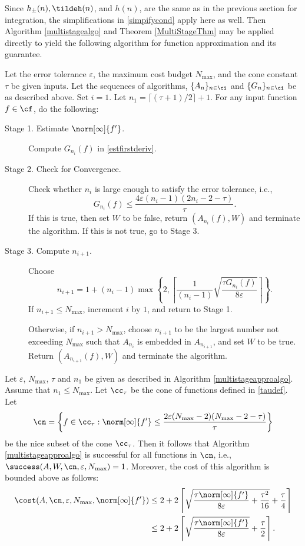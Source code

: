 Since $h_{\pm}(n), \tildeh(n)$, and $h(n)$, are the same as in the previous section for integration, the simplifications in \ref{simpifycond} apply here as well.  Then Algorithm \ref{multistagealgo} and Theorem \ref{MultiStageThm} may be applied directly to  yield the following algorithm for function approximation and its guarantee.

\begin{algo} \label{multistageapproalgo}
Let the error tolerance $\varepsilon$, the maximum cost budget $N_{\max}$, and the cone constant $\tau$ be given inputs. Let the sequences of algorithms, $\{A_n\}_{n \in \ci}$ and  $\{G_n\}_{n \in \ci}$ be as described above.  Set $i=1$.  Let $n_1=\lceil (\tau+1)/2\rceil + 1$. For any input function $f \in \cf$, do the following:
\begin{description}

\item [Stage 1. Estimate {$\norm[\infty]{f'} $}.]
Compute $G_{n_i}(f)$ in \eqref{estfirstderiv}.

\item [Stage 2. Check for Convergence.]
Check whether $n_i$ is large enough to satisfy the error tolerance, i.e.,
$$
G_{n_i}(f) \le \frac{4\varepsilon (n_i-1)(2n_i-2 -\tau)}{\tau} .
$$
If this is true, then set $W$ to be false, return $(A_{n_i}(f),W)$ and terminate the algorithm.   If this is not true, go to Stage 3.

\item[Stage 3. Compute $n_{i+1}$.]  Choose
$$
n_{i+1}=1+ (n_i-1)\max\left\{2,\left\lceil\frac{1}{(n_i-1)}\sqrt{\frac{\tau G_{n_i}(f)}{8\varepsilon}}\right\rceil\right\}.
$$
If $n_{i+1} \le N_{\max}$, increment $i$ by $1$, and return to Stage 1.

Otherwise, if $n_{i+1} > N_{\max}$, choose $n_{i+1}$ to be the largest number not exceeding $N_{\max}$ such that $A_{n_{i}}$ is embedded in $A_{n_{i+1}}$, and set $W$ to be true. Return $(A_{n_{i+1}}(f),W)$ and terminate the algorithm.
\end{description}
\end{algo}

\begin{theorem} \label{multistageappxthm} Let  $\varepsilon$, $N_{\max}$, $\tau$ and $n_1$ be given as described in Algorithm \ref{multistageapproalgo}.  Assume that $n_1 \le N_{\max}$.  Let $\cc_\tau$ be the cone of functions defined in \eqref{taudef}.  Let
$$
\cn
= \left \{ f \in \cc_\tau : \norm[\infty]{f'} \le \frac{2\varepsilon (N_{\max}-2)(N_{\max}-2 -\tau)}{\tau} \right\}
$$
be the nice subset of the cone $\cc_\tau$.  Then it follows that Algorithm \ref{multistageapproalgo} is successful for all functions in $\cn$,  i.e.,  $\success(A,W,\cn,\varepsilon,N_{\max}) = 1$.  Moreover, the cost of this algorithm is bounded above as follows:
\begin{align*}
\cost(A,\cn,\varepsilon,N_{\max},\norm[\infty]{f'})
&\le 2+2 \left \lceil \sqrt{\frac{\tau \norm[\infty]{f'}}{8\varepsilon} + \frac{\tau^2 }{16}} + \frac{\tau}{4} \right\rceil \\
&\le 2+2 \left \lceil\sqrt{\frac{\tau \norm[\infty]{f'}}{8\varepsilon}} + \frac{\tau}{2} \right \rceil.
\end{align*}
\end{theorem}


